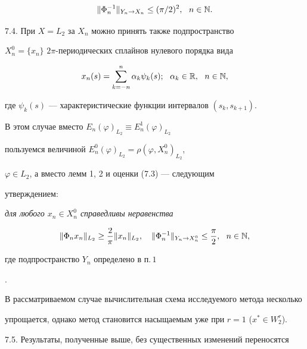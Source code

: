 \begin{equation}


\|\Phi_n^{-1}\|_{Y_n\to X_n}\le ({\pi}/{2})^2, \ \ n\in \N.


\end{equation}


\smallskip





7.4. При $X=L_2$ за $X_n$ можно принять также подпространство 


$X_n^0=\{x_n\}$\; $2\pi$-периодических сплайнов нулевого порядка вида


$$


x_n(s)=\sum_{k=-n}^{n}\alpha_k\psi_k(s);\ \ \alpha_k \in \R,\ \ n \in \N,


$$


где $\psi_k(s)$ --- характеристические функции интервалов $(s_k,s_{k+1})$.


В этом случае вместо $E_n(\varphi)_{L_2}\equiv E_n^1(\varphi)_{L_2}$


пользуемся величиной $E_n^0(\varphi)_{L_2}=\rho(\varphi,X_n^0)_{L_2}$,


$\varphi \in L_2$, а вместо лемм 1, 2 и оценки (7.3) --- следующим


утверждением:


\smallskip





{\it для любого $x_n\in X_n^0$ справедливы неравенства


$$


\|\Phi_n x_n\|_{L_2}\ge \frac{2}{\pi}\|x_n\|_{L_2},\quad


\|\Phi_n^{-1}\|_{Y_n\to X_n^0}\le \frac{\pi}{2}, \ \ n \in \N,


$$


где подпространство $Y_n$ определено в п.\,$1$}.


\smallskip





В рассматриваемом случае вычислительная схема исследуемого метода несколько


упрощается, однако метод становится насыщаемым уже при $r=1$ ($x^*\in


W_2^r$).


\smallskip





7.5. Результаты, полученные выше, без существенных изменений переносятся



